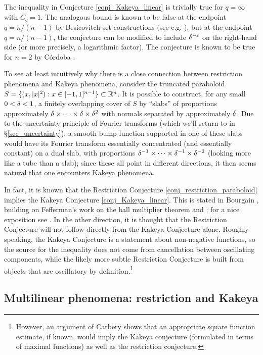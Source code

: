 \documentclass[brochure,english,12pt]{bourbaki}%
\begin{document}
The  inequality in Conjecture \ref{conj_Kakeya_linear} is trivially true for $q=\infty$ with $C_q=1$.
The analogous bound is known to be false at the endpoint $q = n/(n-1)$ by Besicovitch set constructions (see e.g. \cite{BCT06}),
but at the endpoint $q=n/(n-1)$, the conjecture can be modified to include $\delta^{-\varepsilon}$ on the right-hand side (or more precisely, a logarithmic factor).
The conjecture is known to be true for $n=2$ by C\'{o}rdoba \cite{Cor77}.

To see at least intuitively why there is a close connection between restriction phenomena and Kakeya phenomena, consider the truncated paraboloid $S = \{ (x,|x|^2) : x \in [-1,1]^{n-1}\} \subset \mathbb{R}^n$. It is possible to construct, for any small $0<\delta<1$, a finitely overlapping cover of $S$ by ``slabs'' of proportions approximately $\delta \times  \cdots \times \delta \times \delta^2$ with normals separated by approximately $\delta$. Due to the uncertainty principle of Fourier transforms (which we'll return to in \S \ref{sec_uncertainty}), a smooth bump function supported in one of these slabs would have its Fourier transform essentially concentrated (and essentially constant) on a dual slab, with proportions $\delta^{-1} \times \cdots \times \delta^{-1} \times \delta^{-2}$ (looking more like a tube than a slab); since these all point in different directions, it then seems natural that one encounters Kakeya phenomena. 


In fact, it is known that the Restriction Conjecture \ref{conj_restriction_paraboloid} implies the Kakeya Conjecture \ref{conj_Kakeya_linear}. This is stated in Bourgain \cite[Eqn. (0.6)]{Bou91}, building on Fefferman's work on the ball multiplier theorem and \cite{BCSS89}; for a nice exposition see \cite[Prop. 10.5]{Wol03}.
In the other direction, it is thought that the Restriction Conjecture will not follow directly from the Kakeya Conjecture alone. 
Roughly speaking, the  Kakeya Conjecture is a statement about non-negative functions, so the source for the inequality does not come from cancellation between oscillating components, while the likely more subtle Restriction Conjecture is built from objects that are oscillatory by definition.\footnote{However, an argument of Carbery \cite{Car15x} shows that an appropriate square function estimate, if known, would imply the Kakeya conjecture (formulated in terms of maximal functions) as well as the restriction conjecture.}





\subsection{Multilinear phenomena: restriction and Kakeya}\label{sec_mult_Kakeya_intro}
\end{document}
